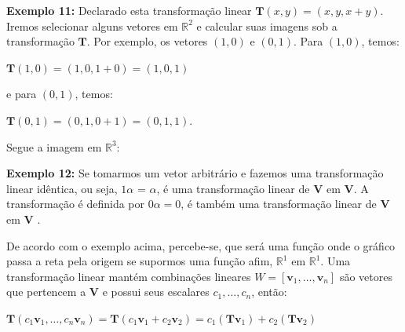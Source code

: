 \noindent\textbf{Exemplo 11:} Declarado esta transformação linear $\mathbf{T}(x, y) = (x, y, x + y)$. Iremos selecionar alguns vetores em $\mathbb{R}^2$ e calcular suas imagens sob a transformação $\mathbf{T}$. Por exemplo, os vetores $(1, 0)$ e $(0, 1)$. Para $(1, 0)$, temos: 

\centerline{$\mathbf{T}(1, 0) = (1, 0, 1 +0) = (1, 0, 1)$}

\noindent e para $(0, 1)$, temos:

\centerline{$\mathbf{T}(0, 1) = (0, 1, 0 + 1) = (0, 1, 1)$.}

Segue a imagem em $\mathbb{R}^3$:


\noindent\textbf{Exemplo 12:} Se tomarmos um vetor arbitrário e fazemos uma transformação linear idêntica, ou seja, $1\alpha$ = $\alpha$, é uma transformação linear de $\mathbf{V}$ em $\mathbf{V}$. A transformação é definida por $0\alpha = 0$, é também uma transformação linear de $\mathbf{V}$ em $\mathbf{V}$ \cite{hoffman1979}.

De acordo com o exemplo acima, percebe-se, que será uma função onde o gráfico passa a reta pela origem se supormos uma função afim, $\mathbb{R}^1$ em $\mathbb{R}^1$. Uma transformação linear mantém combinações lineares $W = [\mathbf{v}_1, \ldots, \mathbf{v}_n]$ são vetores que pertencem a $\mathbf{V}$ e possui seus escalares $c_1, \ldots, c_n$, então:

\centerline{$\mathbf{T}(c_1\mathbf{v}_1, \ldots, c_n\mathbf{v}_n) = \mathbf{T}(c_1\mathbf{v}_1 + c_2\mathbf{v}_2) = c_1(\mathbf{T}\mathbf{v}_1) + c_2(\mathbf{T}\mathbf{v}_2)$}

